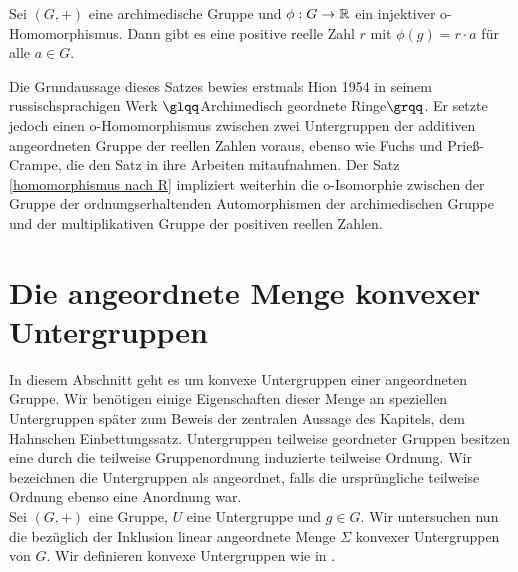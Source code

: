 %
\begin{satz}\label{homomorphismus nach R} %
Sei $\left(G, +\right)$ eine archimedische Gruppe und $\phi: G \rightarrow \mathbb{R}$ ein injektiver o-Homomorphismus. Dann gibt es eine positive reelle Zahl $r$ mit $\phi(g) = r\cdot a$ für alle $a \in G$. 
\end{satz}
Die Grundaussage dieses Satzes bewies erstmals Hion 1954 in seinem russischsprachigen Werk $\glqq$Archimedisch geordnete Ringe$\grqq$. Er setzte jedoch einen o-Homomorphismus zwischen zwei Untergruppen der additiven angeordneten Gruppe der reellen Zahlen voraus, ebenso wie Fuchs und Prieß-Crampe, die den Satz in ihre Arbeiten mitaufnahmen.  Der Satz \ref{homomorphismus nach R} impliziert weiterhin die o-Isomorphie zwischen der Gruppe der ordnungserhaltenden Automorphismen der archimedischen Gruppe und der multiplikativen Gruppe der positiven reellen Zahlen. \cite{priesscrampe83}
%
\section{Die angeordnete Menge konvexer Untergruppen}
In diesem Abschnitt geht es um konvexe Untergruppen einer angeordneten Gruppe. Wir benötigen einige Eigenschaften dieser Menge an speziellen Untergruppen später zum Beweis der zentralen Aussage des Kapitels, dem Hahnschen Einbettungssatz. Untergruppen teilweise geordneter Gruppen besitzen eine durch die teilweise Gruppenordnung induzierte teilweise Ordnung. Wir bezeichnen die Untergruppen als angeordnet, falls die ursprüngliche teilweise Ordnung ebenso eine Anordnung war.\\
Sei $\left(G, +\right)$ eine Gruppe, $U$ eine Untergruppe und $g \in G$. 
Wir untersuchen nun die bezüglich der Inklusion linear angeordnete Menge $\Sigma$ konvexer Untergruppen von $G$. Wir definieren konvexe Untergruppen wie in \cite[S. 3]{priesscrampe83}.

